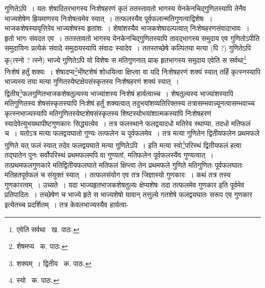 \documentclass[11pt, openany]{book}
\begin{document}
\noindent गुणितेऽपि~। यतः शेषादितरभागस्य निःशेषहरणं कृतं ततस्तावतो भागस्य येनकेनचिद्गुणितस्यापि तेनैव भाज्यशेषेण ह्रियमाणस्य निःशेषत्वमेव स्यात्~। तत्फलस्यैव पूर्वफलान्मतिगुणत्वाद्विशेषः~। भाजकशेषस्यावृत्तिरेव भाज्यशेषस्य हृतांशः~। शेषांशस्यैव भाजकशेषादल्पत्वात् निःशेषहरणसंवादाभावः~। हृतो भागः संवदत एव~। ततस्तावतो भागस्य येनकेनचिद्गुणितस्यापि तावद्भागस्य समुदाय एव गुणितोऽपीति समुदायिनः प्रत्येकं संवादे समुदायस्यापि संवादः स्यादेव~। ततस्तच्छेषे कल्पितया मत्या (पि ?) गुणितेऽपि कृ(त्स्नो ? त्स्ने) भाज्ये गुणितेऽपि यो विशेषः स मतिगुणनात् प्राक् हृतभागस्य समुदाय एवेति स सर्वथा\renewcommand{\thefootnote}{१}\footnote{एवेति सर्वथा \textendash\ ख. पाठः.} निःशेषं हर्तुं शक्यः~। शेषादप्य\renewcommand{\thefootnote}{२}\footnote{शेषमप्य \textendash\ क. पाठः.}भीष्टशेषं शोधयित्वा क्षिप्त्वा वा यदि निःशेषहरणं शक्यं स्यात् तर्हि कृत्स्नस्यापि भाज्यस्य तया मत्या गुणितस्येष्टक्षेपसंस्कृतस्य निःशेषहरणं शक्यं स्यात्~। द्वितीय\renewcommand{\thefootnote}{३}\footnote{शक्यम्~। द्वितीय \textendash\ क. पाठः.}फलगुणितभाजकशेषतुल्यस्य भाज्यांशस्य निःशेषं हार्यत्वाच्च~। शेषतुल्यस्य भाज्यांशस्यापि मतिगुणितस्य शेषसंस्कृतस्यापि निःशेषं हर्तुं शक्यत्वात् तदुभयांशव्यतिरिक्तस्य तत्रासम्भवान्न्यूनत्वासम्भवाच्च कृत्स्नभाज्यस्यापि मतिगुणितस्येष्टशेषसंस्कृतस्य शिष्टस्योभयांशात्मकस्यापि निःशेषहरणं स्यादेवेत्युभयथापीष्टगुणकारः सिद्ध्यत्येव~। तत्र फलस्थाने फलद्वयादधो मतिरेव स्थाप्या, तदधो मतिफलं च~। यतोऽत्र मत्या फलद्वयघातो गुण्यः तत्फलेन च पूर्वफलमेव~। तत्र मत्या गुणितेन द्वितीयफलेन प्रथमफले गुणिते यत् फलं स्यात् तदेव फलद्वयघाते मत्या गुणितेऽपि~। इति मत्या स्वो\renewcommand{\thefootnote}{४}\footnote{स्यो \textendash\ क. पाठः.}परिस्थं द्वितीयफलं हत्वा तद्घातेन पुनः सर्वोपरिस्थं प्रथमफलमपि वा गुण्यतां, मतिफलेन पूर्वफलस्यैव गुण्यत्वात्~। तत्प्रथमफलगुणकारे मतिद्वितीयफलघाते मतिफलं क्षिप्त्वा तेन प्रथमफले गुणिते मतिगुणितः पूर्वफलघातः मतिहतपूर्वफलं च संयुक्तं स्यात्~। तत्फलसंयोग एव तत्र जिज्ञास्यो गुणकारः~। कथं तत्र तस्य गुणकारत्वम्~। उच्यते~। यदा भाज्यहृतभाजकशेषतुल्यः क्षेप्यशेषः तदा तत्फलमेव गुणकार इति पूर्वमेव प्रतिपादितः~। तच्छेषेण च भाज्ये हृते स भाज्यशेषो यावान् तत्तुल्ये गतशेषे फलद्वयघातः सरूप एव गुणकार इत्येतच्च प्रदर्शितम्~। तत्र केवलभाज्यस्यैव हार्यत्वा-

\newpage
\end{document}
